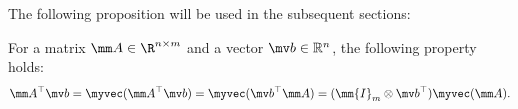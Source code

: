 \documentclass[letterpaper, journal, twoside]{IEEEtran}
\begin{document}
The following proposition will be used in the subsequent sections:

\begin{propsit} \label{propsit:kron}
  For a matrix $\mm A\in\R^{n\times m}$ and a vector $\mv b\in\mathbb R^n$, the following property holds:
  \begin{equation}
    \mm A^\top \mv b 
    = 
    \myvec(\mm A^\top\mv b)
    =
    \myvec(\mv b^\top\mm A)
    = 
    (\mm{I}_{m}\otimes \mv b^\top) \myvec(\mm A)
    .
  \end{equation}
\end{propsit}



\end{document}
